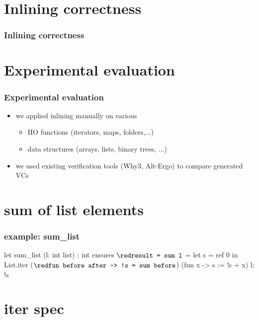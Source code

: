 \documentclass[xcolor=dvipsnames]{beamer}
\begin{document}


\section*{Inlining correctness}
\begin{frame}[fragile]
\frametitle<1>{Inlining correctness}
\begin{large}
\end{large}
\end{frame}


\section*{Experimental evaluation}
\begin{frame}
\frametitle{Experimental evaluation}
\begin{itemize}
\item we applied inlining manually on various 
\begin{itemize}
\item {\red HO functions} (iterators, maps, folders,...)
\item {\red data structures} (arrays, lists, binary trees, ...) \pause \bigskip
\end{itemize}
\item we used existing {\red verification tools} (Why3, Alt-Ergo) to compare generated VCs
\end{itemize}
\end{frame}

\section*{sum of list elements} 
\begin{frame}[fragile]
\frametitle{example: sum\_list}
\hspace*{-1em}
\begin{whycode}
 let sum_list (l: int list) : int
 ensures { ${\red \texttt{result =  sum l}}$ }
 = let s = ref 0 in
   List.iter 
     (${\red\texttt{fun before after -> !s = sum before}}$) 
     (fun x -> s := !s + x) l; 
   !s     
\end{whycode}
\end{frame}


\section*{iter spec}
\end{document}
